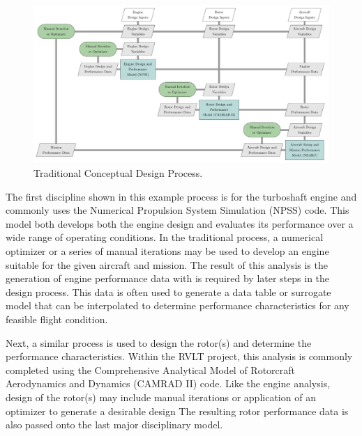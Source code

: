\begin{figure}[htb]
\begin{center}
 \includegraphics[width=1.0\textwidth]{../Images/Traditional_XDSM.pdf}
 \caption{Traditional Conceptual Design Process.}
 \label{f:trad_XDSM}
\end{center}
\end{figure}

The first discipline shown in this example process is for the turboshaft engine and commonly uses the Numerical Propulsion System Simulation (NPSS) code.\cite{claus1991numerical} 
This model both develops both the engine design and evaluates its performance over a wide range of operating conditions.
In the traditional process, a numerical optimizer or a series of manual iterations may be used to develop an engine suitable for the given aircraft and mission.
The result of this analysis is the generation of engine performance data with is required by later steps in the design process.
This data is often used to generate a data table or surrogate model that can be interpolated to determine performance characteristics for any feasible flight condition.

Next, a similar process is used to design the rotor(s) and determine the performance characteristics.
Within the RVLT project, this analysis is commonly completed using the Comprehensive Analytical Model of Rotorcraft Aerodynamics and Dynamics (CAMRAD II) code.\cite{johnson1994technology,johnson1998rotorcraft,johnson19981rotorcraft}
Like the engine analysis, design of the rotor(s) may include manual iterations or application of an optimizer to generate a desirable design
The resulting rotor performance data is also passed onto the last major disciplinary model.

